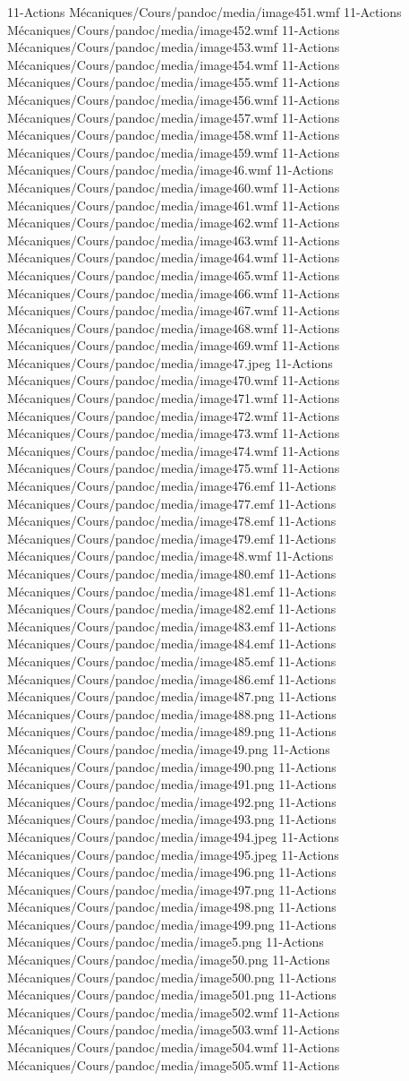 11-Actions Mécaniques/Cours/pandoc/media/image451.wmf 11-Actions Mécaniques/Cours/pandoc/media/image452.wmf 11-Actions Mécaniques/Cours/pandoc/media/image453.wmf 11-Actions Mécaniques/Cours/pandoc/media/image454.wmf 11-Actions Mécaniques/Cours/pandoc/media/image455.wmf 11-Actions Mécaniques/Cours/pandoc/media/image456.wmf 11-Actions Mécaniques/Cours/pandoc/media/image457.wmf 11-Actions Mécaniques/Cours/pandoc/media/image458.wmf 11-Actions Mécaniques/Cours/pandoc/media/image459.wmf 11-Actions Mécaniques/Cours/pandoc/media/image46.wmf 11-Actions Mécaniques/Cours/pandoc/media/image460.wmf 11-Actions Mécaniques/Cours/pandoc/media/image461.wmf 11-Actions Mécaniques/Cours/pandoc/media/image462.wmf 11-Actions Mécaniques/Cours/pandoc/media/image463.wmf 11-Actions Mécaniques/Cours/pandoc/media/image464.wmf 11-Actions Mécaniques/Cours/pandoc/media/image465.wmf 11-Actions Mécaniques/Cours/pandoc/media/image466.wmf 11-Actions Mécaniques/Cours/pandoc/media/image467.wmf 11-Actions Mécaniques/Cours/pandoc/media/image468.wmf 11-Actions Mécaniques/Cours/pandoc/media/image469.wmf 11-Actions Mécaniques/Cours/pandoc/media/image47.jpeg 11-Actions Mécaniques/Cours/pandoc/media/image470.wmf 11-Actions Mécaniques/Cours/pandoc/media/image471.wmf 11-Actions Mécaniques/Cours/pandoc/media/image472.wmf 11-Actions Mécaniques/Cours/pandoc/media/image473.wmf 11-Actions Mécaniques/Cours/pandoc/media/image474.wmf 11-Actions Mécaniques/Cours/pandoc/media/image475.wmf 11-Actions Mécaniques/Cours/pandoc/media/image476.emf 11-Actions Mécaniques/Cours/pandoc/media/image477.emf 11-Actions Mécaniques/Cours/pandoc/media/image478.emf 11-Actions Mécaniques/Cours/pandoc/media/image479.emf 11-Actions Mécaniques/Cours/pandoc/media/image48.wmf 11-Actions Mécaniques/Cours/pandoc/media/image480.emf 11-Actions Mécaniques/Cours/pandoc/media/image481.emf 11-Actions Mécaniques/Cours/pandoc/media/image482.emf 11-Actions Mécaniques/Cours/pandoc/media/image483.emf 11-Actions Mécaniques/Cours/pandoc/media/image484.emf 11-Actions Mécaniques/Cours/pandoc/media/image485.emf 11-Actions Mécaniques/Cours/pandoc/media/image486.emf 11-Actions Mécaniques/Cours/pandoc/media/image487.png 11-Actions Mécaniques/Cours/pandoc/media/image488.png 11-Actions Mécaniques/Cours/pandoc/media/image489.png 11-Actions Mécaniques/Cours/pandoc/media/image49.png 11-Actions Mécaniques/Cours/pandoc/media/image490.png 11-Actions Mécaniques/Cours/pandoc/media/image491.png 11-Actions Mécaniques/Cours/pandoc/media/image492.png 11-Actions Mécaniques/Cours/pandoc/media/image493.png 11-Actions Mécaniques/Cours/pandoc/media/image494.jpeg 11-Actions Mécaniques/Cours/pandoc/media/image495.jpeg 11-Actions Mécaniques/Cours/pandoc/media/image496.png 11-Actions Mécaniques/Cours/pandoc/media/image497.png 11-Actions Mécaniques/Cours/pandoc/media/image498.png 11-Actions Mécaniques/Cours/pandoc/media/image499.png 11-Actions Mécaniques/Cours/pandoc/media/image5.png 11-Actions Mécaniques/Cours/pandoc/media/image50.png 11-Actions Mécaniques/Cours/pandoc/media/image500.png 11-Actions Mécaniques/Cours/pandoc/media/image501.png 11-Actions Mécaniques/Cours/pandoc/media/image502.wmf 11-Actions Mécaniques/Cours/pandoc/media/image503.wmf 11-Actions Mécaniques/Cours/pandoc/media/image504.wmf 11-Actions Mécaniques/Cours/pandoc/media/image505.wmf 11-Actions 